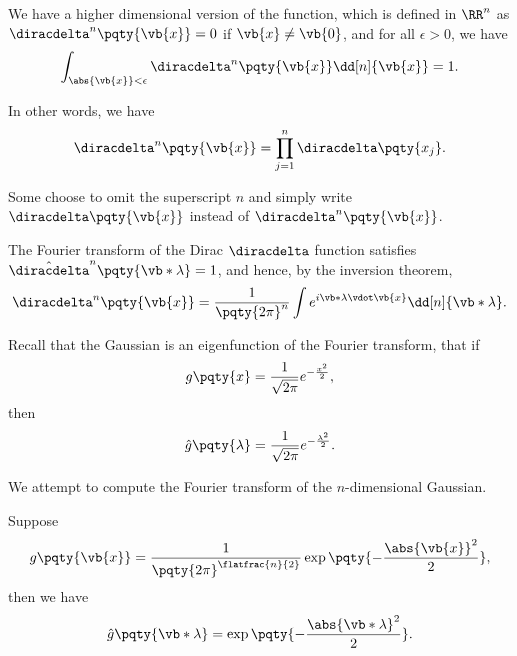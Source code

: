 We have a higher dimensional version of the  function, which is defined in \(\RR^n\) as \(\diracdelta^n \pqty{\vb{x}} = 0\) if \(\vb{x} \neq \vb{0}\), and for all \(\epsilon > 0\), we have
\begin{equation}
    \int_{\abs{\vb{x}} < \epsilon} \diracdelta^n \pqty{\vb{x}} \dd[n]{\vb{x}} = 1.
\end{equation}

In other words, we have
\begin{equation}
    \diracdelta^n \pqty{\vb{x}} = \prod_{j = 1}^{n} \diracdelta\pqty{x_j}.
\end{equation}

Some choose to omit the superscript \(n\) and simply write \(\diracdelta\pqty{\vb{x}}\) instead of \(\diracdelta^n\pqty{\vb{x}}\).

The Fourier transform of the Dirac \(\diracdelta\) function satisfies \(\hat{\diracdelta}^n \pqty{\vb*{\lambda}} = 1\), and hence, by the inversion theorem,
\begin{equation}
    \diracdelta^n \pqty{\vb{x}} = \frac{1}{\pqty{2 \pi}^n} \int e^{i \vb*{\lambda} \vdot \vb{x}} \dd[n]{\vb*{\lambda}}.
\end{equation}

Recall that the Gaussian is an eigenfunction of the Fourier transform, that if
\begin{equation}
    g\pqty{x} = \frac{1}{\sqrt{2 \pi}} e^{- \frac{x^2}{2}},
\end{equation}
then
\begin{equation}
    \hat{g}\pqty{\lambda} = \frac{1}{\sqrt{2 \pi}} e^{- \frac{\lambda^2}{2}}.
\end{equation}

We attempt to compute the Fourier transform of the \(n\)-dimensional Gaussian.
 
\begin{proposition}
    Suppose
    \begin{equation}
        g\pqty{\vb{x}} = \frac{1}{\pqty{2 \pi}^{\flatfrac{n}{2}}} \exp\pqty{- \frac{\abs{\vb{x}}^2}{2}},
    \end{equation}
    then we have
    \begin{equation}
        \hat{g} \pqty{\vb*{\lambda}} = \exp\pqty{- \frac{\abs{\vb*{\lambda}}^2}{2}}.
    \end{equation}
\end{proposition}

